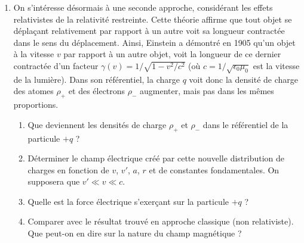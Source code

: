 \begin{enumerate}
\item On s'intéresse désormais à une seconde approche, considérant les effets relativistes de la relativité restreinte. Cette théorie affirme que tout objet se déplaçant relativement par rapport à un autre voit sa longueur contractée dans le sens du déplacement. Ainsi, Einstein a démontré en 1905 qu'un objet à la vitesse $v$ par rapport à un autre objet, voit la longueur de ce dernier contractée d'un facteur $\gamma(v)=1/\sqrt{1-v^{2}/c^{2}}$ (où $c=1/\sqrt{\epsilon_{0}\mu_{0}}$ est la vitesse de la lumière). Dans son référentiel, la charge $q$ voit donc la densité de charge des atomes $\rho_+$ et des électrons $\rho_-$ augmenter, mais pas dans les mêmes proportions. 
	\begin{enumerate}
		\item Que deviennent les densités de charge $\rho_{+}$ et $\rho_{-}$ dans le référentiel de la particule $+q$ ? %
		\item Déterminer le champ électrique créé par cette nouvelle distribution de charges en fonction de $v$, $v'$, $a$, $r$ et de constantes fondamentales. On supposera que $v'\ll v\ll c$.
		\item Quelle est la force électrique s'exerçant sur la particule $+q$ ? 
		\item Comparer avec le résultat trouvé en approche classique (non relativiste). Que peut-on en dire sur la nature du champ magnétique ?
	\end{enumerate}
			
\end{enumerate}

\newpage

